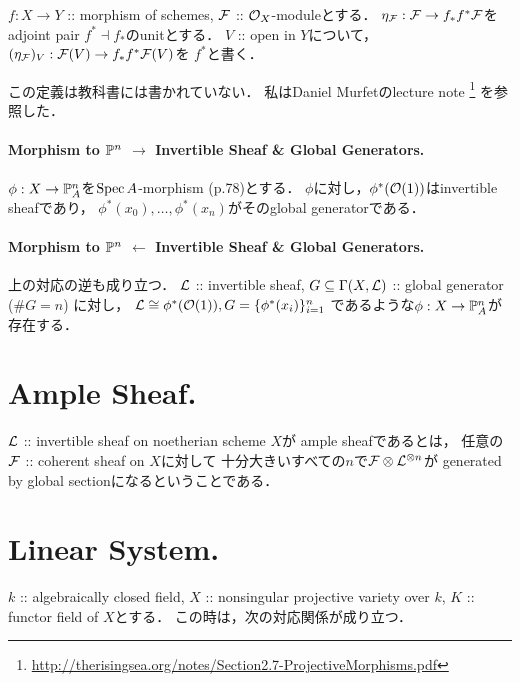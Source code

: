 \documentclass[a4paper]{jsarticle}
\begin{document}
    \begin{Def}
        $f: X \to Y$ :: morphism of schemes,
        $\mathcal{F}$ :: $\mathcal{O}_X$-moduleとする．
        $\eta_{\mathcal{F}}: \mathcal{F} \to f_* f^* \mathcal{F}$をadjoint pair $f^* \dashv f_*$のunitとする．
        $V$ :: open in $Y$について，
        $(\eta_{\mathcal{F}})_V: \mathcal{F}(V) \to f_*f^*\mathcal{F}(V)$を
        $f^*$と書く．
    \end{Def}
    この定義は教科書には書かれていない．
    私はDaniel Murfetのlecture note
    \footnote{ \url{http://therisingsea.org/notes/Section2.7-ProjectiveMorphisms.pdf} }
    を参照した．

    \paragraph{Morphism to $\mathbb{P}^n$ $\rightarrow$ Invertible Sheaf \& Global Generators.}
    $\phi: X \to \mathbb{P}_A^n$を$\operatorname{Spec} A$-morphism (p.78)とする．
    $\phi$に対し，$\phi^*(\mathcal{O}(1))$はinvertible sheafであり，
    $\phi^*(x_0), \dots, \phi^*(x_n)$がそのglobal generatorである．

    \paragraph{Morphism to $\mathbb{P}^n$ $\leftarrow$ Invertible Sheaf \& Global Generators.}
    上の対応の逆も成り立つ．
    $\mathcal{L}$ :: invertible sheaf,
    $G \subseteq \Gamma(X, \mathcal{L})$ :: global generator ($\#G=n$)
    に対し，
    $\mathcal{L} \cong \phi^*(\mathcal{O}(1)), G=\{\phi^*(x_i)\}_{i=1}^n$
    であるような$\phi: X \to \mathbb{P}_A^n$が存在する．

\section{Ample Sheaf.}
    \begin{Def}
        $\mathcal{L}$ :: invertible sheaf on noetherian scheme $X$が
        ample sheafであるとは，
        任意の$\mathcal{F}$ :: coherent sheaf on $X$に対して
        十分大きいすべての$n$で$\mathcal{F} \otimes \mathcal{L}^{\otimes n}$が
        generated by global sectionになるということである．
    \end{Def}

\section{Linear System.}
    $k$ :: algebraically closed field,
    $X$ :: nonsingular projective variety over $k$,
    $K$ :: functor field of $X$とする．
    この時は，次の対応関係が成り立つ．
\end{document}
